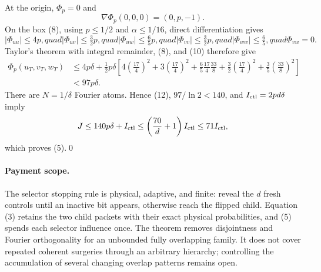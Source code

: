 At the origin, $\Phi_p=0$ and
\[
 \nabla\Phi_p(0,0,0)=(0,p,-1).
\]
On the box (8), using $p\le1/2$ and $\alpha\le1/16$, direct
differentiation gives
\[
 |\Phi_{uu}|\le4p,quad |\Phi_{uv}|\le\tfrac32p,quad
 |\Phi_{uw}|\le\tfrac65p,quad |\Phi_{vv}|\le\tfrac32p,quad
 |\Phi_{ww}|\le\tfrac65,quad \Phi_{vw}=0.              \tag{13}
\]
Taylor's theorem with integral remainder, (8), and (10) therefore give
\begin{align*}
 \Phi_p(u_T,v_T,w_T)
 &\le4p\delta+\frac12p\delta\left[
 4\left(\frac{17}{4}\right)^2
 +3\left(\frac{17}{4}\right)^2
 +\frac65\frac{17}{4}\frac{33}{8}
 +\frac32\left(\frac{17}{4}\right)^2
 +\frac35\left(\frac{33}{8}\right)^2\right]\\
 &<97p\delta.                                             \tag{14}
\end{align*}
There are $N=1/\delta$ Fourier atoms.  Hence (12), $97/\ln2<140$, and
$I_{\rm ctl}=2pd\delta$ imply
\[
 J\le140p\delta+I_{\rm ctl}
 \le\left(\frac{70}{d}+1\right)I_{\rm ctl}
 \le71I_{\rm ctl},
\]
which proves (5).\qed

\paragraph{Payment scope.}
The selector stopping rule is physical, adaptive, and finite: reveal the
$d$ fresh controls until an inactive bit appears, otherwise reach the
flipped child.  Equation (3) retains the two child packets with their exact
physical probabilities, and (5) spends each selector influence once.  The
theorem removes disjointness and Fourier orthogonality for an unbounded
fully overlapping family.  It does not cover repeated coherent surgeries
through an arbitrary hierarchy; controlling the accumulation of several
changing overlap patterns remains open.
